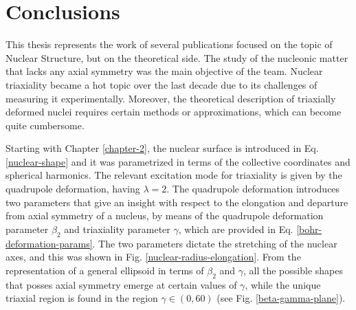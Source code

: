 \chapter{Conclusions}
\label{chapter-8-conclusions}

This thesis represents the work of several publications focused on the topic of Nuclear Structure, but on the theoretical side. The study of the nucleonic matter that lacks any axial symmetry was the main objective of the team. Nuclear triaxiality became a hot topic over the last decade due to its challenges of measuring it experimentally. Moreover, the theoretical description of triaxially deformed nuclei requires certain methods or approximations, which can become quite cumbersome.

Starting with Chapter \ref{chapter-2}, the nuclear surface is introduced in Eq. \ref{nuclear-shape} and it was parametrized in terms of the collective coordinates and spherical harmonics. The relevant excitation mode for triaxiality is given by the quadrupole deformation, having $\lambda=2$. The quadrupole deformation introduces two parameters that give an insight with respect to the elongation and departure from axial symmetry of a nucleus, by means of the quadrupole deformation parameter $\beta_2$ and triaxiality parameter $\gamma$, which are provided in Eq. \ref{bohr-deformation-params}. The two parameters dictate the stretching of the nuclear axes, and this was shown in Fig. \ref{nuclear-radius-elongation}. From the representation of a general ellipsoid in terms of $\beta_2$ and $\gamma$, all the possible shapes that posses axial symmetry emerge at certain values of $\gamma$, while the unique triaxial region is found in the region $\gamma\in(0,60)$ (see Fig. \ref{beta-gamma-plane}).

